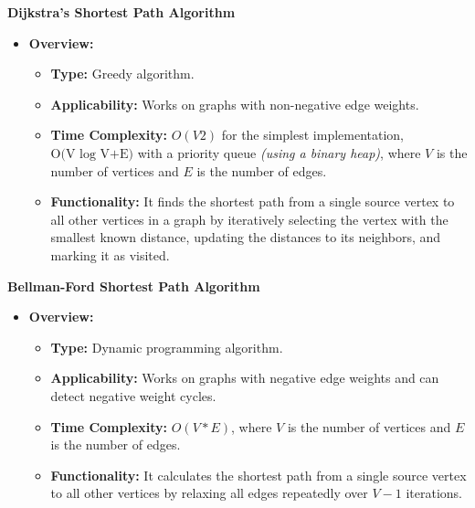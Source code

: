 \documentclass[
  letterpaper,
  DIV=11,
  numbers=noendperiod]{scrreprt}
\providecommand{\tightlist}{%
  \setlength{\itemsep}{0pt}\setlength{\parskip}{0pt}}
\begin{document}
\begin{tcolorbox}[enhanced jigsaw, colframe=quarto-callout-note-color-frame, toprule=.15mm, bottomrule=.15mm, rightrule=.15mm, colback=white, breakable, arc=.35mm, opacityback=0, left=2mm, leftrule=.75mm]

\vspace{-3mm}\textbf{Dijkstra's Shortest Path Algorithm}\vspace{3mm}

\begin{itemize}
\item
  \textbf{Overview:}

  \begin{itemize}
  \tightlist
  \item
    \textbf{Type:} Greedy algorithm.
  \item
    \textbf{Applicability:} Works on graphs with non-negative edge
    weights.
  \item
    \textbf{Time Complexity:} \(O(V2)\) for the simplest implementation,
    \(\text{O(V log V+E)}\) with a priority queue \emph{(using a binary
    heap)}, where \(V\) is the number of vertices and \(E\) is the
    number of edges.
  \item
    \textbf{Functionality:} It finds the shortest path from a single
    source vertex to all other vertices in a graph by iteratively
    selecting the vertex with the smallest known distance, updating the
    distances to its neighbors, and marking it as visited.
  \end{itemize}
\end{itemize}

\end{tcolorbox}

\begin{tcolorbox}[enhanced jigsaw, colframe=quarto-callout-note-color-frame, toprule=.15mm, bottomrule=.15mm, rightrule=.15mm, colback=white, breakable, arc=.35mm, opacityback=0, left=2mm, leftrule=.75mm]

\vspace{-3mm}\textbf{Bellman-Ford Shortest Path Algorithm}\vspace{3mm}

\begin{itemize}
\item
  \textbf{Overview:}

  \begin{itemize}
  \tightlist
  \item
    \textbf{Type:} Dynamic programming algorithm.
  \item
    \textbf{Applicability:} Works on graphs with negative edge weights
    and can detect negative weight cycles.
  \item
    \textbf{Time Complexity:} \(O(V*E)\), where \(V\) is the number of
    vertices and \(E\) is the number of edges.
  \item
    \textbf{Functionality:} It calculates the shortest path from a
    single source vertex to all other vertices by relaxing all edges
    repeatedly over \(V−1\) iterations.
  \end{itemize}
\end{itemize}

\end{tcolorbox}
\end{document}
